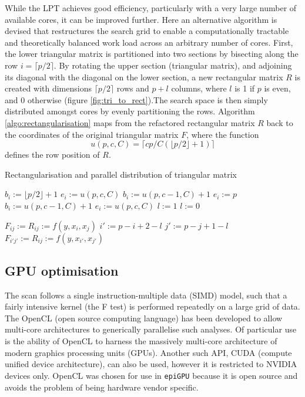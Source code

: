While the LPT achieves good efficiency, particularly with a very large number of available cores, it can be improved further. Here an alternative algorithm is devised that restructures the search grid to enable a computationally tractable and theoretically balanced work load across an arbitrary number of cores. First, the lower triangular matrix is partitioned into two sections by bisecting along the row $i = \lceil p / 2 \rceil$. By rotating the upper section (triangular matrix), and adjoining its diagonal with the diagonal on the lower section, a new rectangular matrix $R$ is created with dimensions $\lceil p / 2 \rceil$ rows and $p + l$ columns, where $l$ is 1 if $p$ is even, and $0$ otherwise (figure \ref{fig:tri_to_rect}).The search space is then simply distributed amongst cores by evenly partitioning the rows. Algorithm \ref{algo:rectangularisation} maps from the refactored rectangular matrix $R$ back to the coordinates of the original triangular matrix $F$, where the function
\begin{equation}
u(p, c, C) = \lceil cp/C(\lfloor p/2 \rfloor + 1) \rceil
\end{equation}
defines the row position of $R$. 

\begin{algorithm}
\caption{Rectangularisation and parallel distribution of triangular matrix}
\label{algo:rectangularisation}
\begin{algorithmic}

  \STATE $b_i := \lfloor p/2 \rfloor + 1$
  \STATE $e_i := u(p, c, C)$
  \STATE $b_i := u(p, c-1, C)+1$
  \STATE $e_i := p$
\ELSE
  \STATE $b_i := u(p, c-1, C)+1$
  \STATE $e_i := u(p, c, C)$
\ENDIF
{}
  \STATE $l := 1$
\ELSE
  \STATE $l := 0$
\ENDIF

      \STATE $F_{ij} := R_{ij} := f(y, x_i, x_j)$
    \ELSE
      \STATE ${i}' := p - i + 2 - l$
      \STATE ${j}' := p - j + 1 - l$
      \STATE $F_{{i}'{j}'} := R_{ij} := f(y, x_{{i}'}, x_{{j}'})$
    \ENDIF
  \ENDFOR
\ENDFOR

\end{algorithmic}
\end{algorithm}

\subsection{GPU optimisation}

The scan follows a single instruction-multiple data (SIMD) model, such that a fairly intensive kernel (the F test) is performed repeatedly on a large grid of data. The OpenCL (open source computing language) has been developed to allow multi-core architectures to generically parallelise such analyses. Of particular use is the ability of OpenCL to harness the massively multi-core architecture of modern graphics processing units (GPUs). Another such API, CUDA (compute unified device architecture), can also be used, however it is restricted to NVIDIA devices only. OpenCL was chosen for use in {\tt epiGPU} because it is open source and avoids the problem of being hardware vendor specific.

